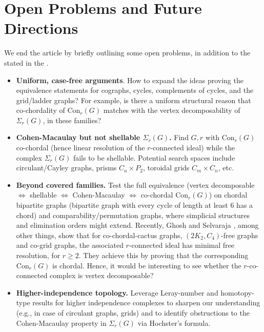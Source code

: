 \documentclass[12pt,reqno]{amsart}
\theoremstyle{definition}
\newcommand{\Con}{{\mathrm{Con}}}
\begin{document}
\section*{Open Problems and Future Directions}
We end the article by briefly outlining some open problems, in addition to the  stated in the . 
\begin{itemize} 

  \item \textbf{Uniform, case-free arguments}. How to expand the ideas proving the equivalence statements for cographs, cycles, complements of cycles, and the grid/ladder graphs? For example, is there a uniform structural reason that co-chordality of $\mathrm{Con}_r(G)$ matches with the vertex decomposability of $\Sigma_r(G)$, in these families?

  \item \textbf{Cohen-Macaulay but not shellable $\Sigma_r(G)$.} Find $G,r$ with $\mathrm{Con}_r(G)$ co-chordal (hence linear resolution of the $r$-connected ideal) while the complex $\Sigma_r(G)$ fails to be shellable. Potential search spaces include circulant/Cayley graphs, prisms $C_n\times P_2$, toroidal grids $C_m\times C_n$, etc.

  \item \textbf{Beyond covered families.} Test the full equivalence (vertex decomposable $\Leftrightarrow$ shellable $\Leftrightarrow$ Cohen-Macaulay $\Leftrightarrow$ co-chordal $\mathrm{Con}_r(G)$) on chordal bipartite graphs (bipartite graph with every cycle of length at least $6$ has a chord) and comparability/permutation graphs, where simplicial structures and elimination orders might extend.
  Recently, Ghosh and Selvaraja \cite{ghoshSelva}, among other things, show that for co-chordal-cactus graphs, $(2K_2, C_4)$-free graphs and co-grid graphs, the associated $r$-connected ideal has minimal free resolution, for $r\geq 2$. They achieve this by proving that the corresponding $\Con_r(G)$ is chordal. 
  Hence, it would be interesting to see whether the $r$-co-connected complex is vertex decomposable?


  \item \textbf{Higher-independence topology.} Leverage Leray-number and homotopy-type results for higher independence complexes to sharpen our understanding (e.g., in case of circulant graphs, grids) and to identify obstructions to the Cohen-Macaulay property in $\Sigma_r(G)$ via Hochster’s formula.


\end{itemize}
\end{document}
